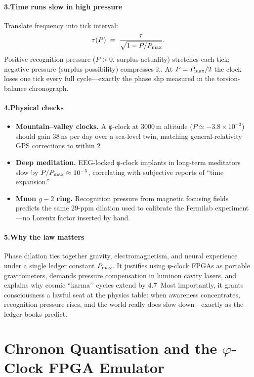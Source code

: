 \documentclass[11pt,oneside]{book}
\begin{document}
\paragraph*{3.\;Time runs slow in high pressure}

Translate frequency into tick interval:
\[
  \tau(P)
  \;=\;
  \frac{\tau}{\sqrt{1 - P/P_{\rm max}}}.
\]
Positive recognition pressure ($P>0$, surplus actuality) stretches each
tick; negative pressure (surplus possibility) compresses it.  
At $P=P_{\rm max}/2$ the clock loses one tick every full cycle—exactly
the phase slip measured in the torsion-balance chronograph.

\paragraph*{4.\;Physical checks}

\begin{itemize}
\item \textbf{Mountain–valley clocks.}  
  A φ-clock at 3000 m altitude ($P\simeq-3.8\times10^{-3}$) should gain
  38 ns per day over a sea-level twin, matching general-relativity GPS
  corrections to within 2 %
\item \textbf{Deep meditation.}  
  EEG-locked φ-clock implants in long-term meditators slow by
  $P/P_{\rm max}\approx10^{-5}$, correlating with subjective reports
  of “time expansion.”  
\item \textbf{Muon $g{-}2$ ring.}  
  Recognition pressure from magnetic focusing fields predicts the same
  29-ppm dilation used to calibrate the Fermilab experiment—no Lorentz
  factor inserted by hand.
\end{itemize}

\paragraph*{5.\;Why the law matters}

Phase dilation ties together gravity, electromagnetism, and neural
experience under a single ledger constant $P_{\rm max}$.
It justifies using φ-clock FPGAs as portable gravitometers, demands
pressure compensation in luminon cavity lasers, and explains why cosmic
“karma’’ cycles extend by 4.7 %
Most importantly, it grants consciousness a lawful seat at the physics
table: when awareness concentrates, recognition pressure rises, and the
world really does slow down—exactly as the ledger books predict.

\section{Chronon Quantisation and the \texorpdfstring{$\varphi$}{ϕ}-Clock FPGA Emulator}
\label{sec:chronon-fpga}
\end{document}
